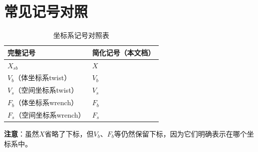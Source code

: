 \documentclass{article}
\begin{document}
\section{常见记号对照}

\begin{table}[h]
\centering
\begin{tabular}{|l|l|}
\hline
\textbf{完整记号} & \textbf{简化记号（本文档）} \\
\hline
$X_{sb}$ & $X$ \\
\hline
$V_b$（体坐标系twist） & $V_b$ \\
\hline
$V_s$（空间坐标系twist） & $V_s$ \\
\hline
$F_b$（体坐标系wrench） & $F_b$ \\
\hline
$F_s$（空间坐标系wrench） & $F_s$ \\
\hline
\end{tabular}
\caption{坐标系记号对照表}
\end{table}

\textbf{注意}：虽然$X$省略了下标，但$V_b$、$F_b$等仍然保留下标，因为它们明确表示在哪个坐标系中。
\end{document}
